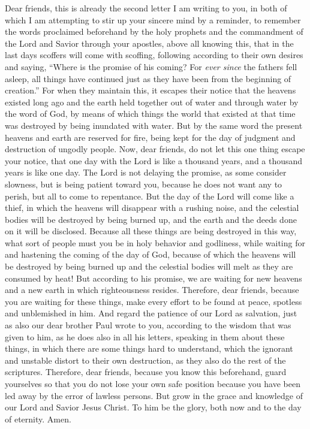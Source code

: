 \begin{biblechapter} %
 Dear friends, this is already the second letter I am writing to you, in both of which I am attempting to stir up your sincere mind by a reminder,
\verse to remember the words proclaimed beforehand by the holy prophets and the commandment of the Lord and Savior through your apostles,
\verse above all knowing this, that in the last days scoffers will come with scoffing, following according to their own desires
\verse and saying, “Where is the promise of his coming? For \textit{ever since} the fathers fell asleep, all things have continued just as they have been from the beginning of creation.”
\verse For when they maintain this, it escapes their notice that the heavens existed long ago and the earth held together out of water and through water by the word of God,
\verse by means of which things the world that existed at that time was destroyed by being inundated with water.
\verse But by the same word the present heavens and earth are reserved for fire, being kept for the day of judgment and destruction of ungodly people.
\verse Now, dear friends, do not let this one thing escape your notice, that one day with the Lord is like a thousand years, and a thousand years is like one day.
\verse The Lord is not delaying the promise, as some consider slowness, but is being patient toward you, because he does not want any to perish, but all to come to repentance.
\verse But the day of the Lord will come like a thief, in which the heavens will disappear with a rushing noise, and the celestial bodies will be destroyed by being burned up, and the earth and the deeds done on it will be disclosed.
\verse Because all these things are being destroyed in this way, what sort of people must you be in holy behavior and godliness,
\verse while waiting for and hastening the coming of the day of God, because of which the heavens will be destroyed by being burned up and the celestial bodies will melt as they are consumed by heat!
\verse But according to his promise, we are waiting for new heavens and a new earth in which righteousness resides.
 Therefore, dear friends, because you are waiting for these things, make every effort to be found at peace, spotless and unblemished in him.
\verse And regard the patience of our Lord as salvation, just as also our dear brother Paul wrote to you, according to the wisdom that was given to him,
\verse as he does also in all his﻿ letters, speaking in them about these things, in which there are some things hard to understand, which the ignorant and unstable distort to their own destruction, as they also do the rest of the scriptures.
\verse Therefore, dear friends, because you know this beforehand, guard yourselves so that you do not lose your own safe position because you have been led away by the error of lawless persons.
\verse But grow in the grace and knowledge of our Lord and Savior Jesus Christ. To him be the glory, both now and to the day of eternity. Amen.
\end{biblechapter}

